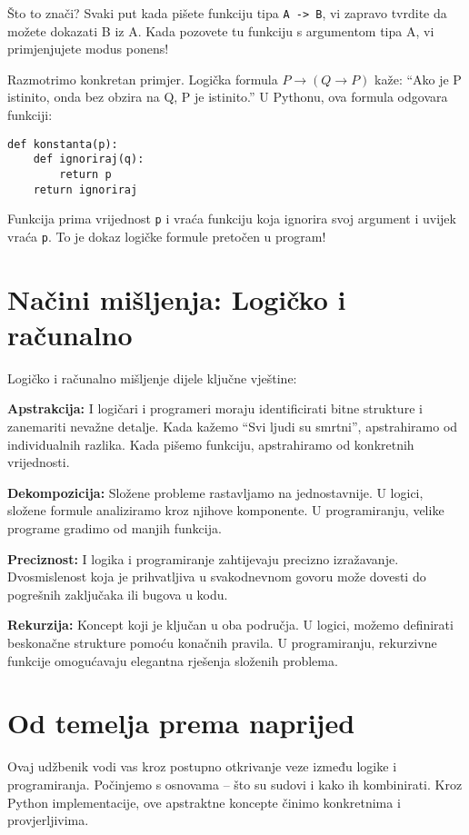 Što to znači? Svaki put kada pišete funkciju tipa \texttt{A -> B}, vi zapravo tvrdite da možete dokazati B iz A. Kada pozovete tu funkciju s argumentom tipa A, vi primjenjujete modus ponens!

Razmotrimo konkretan primjer. Logička formula $P \rightarrow (Q \rightarrow P)$ kaže: ``Ako je P istinito, onda bez obzira na Q, P je istinito.'' U Pythonu, ova formula odgovara funkciji:
\begin{verbatim}
def konstanta(p):
    def ignoriraj(q):
        return p
    return ignoriraj
\end{verbatim}

Funkcija prima vrijednost \texttt{p} i vraća funkciju koja ignorira svoj argument i uvijek vraća \texttt{p}. To je dokaz logičke formule pretočen u program!

\section*{Načini mišljenja: Logičko i računalno}

Logičko i računalno mišljenje dijele ključne vještine:

\textbf{Apstrakcija:} I logičari i programeri moraju identificirati bitne strukture i zanemariti nevažne detalje. Kada kažemo ``Svi ljudi su smrtni'', apstrahiramo od individualnih razlika. Kada pišemo funkciju, apstrahiramo od konkretnih vrijednosti.

\textbf{Dekompozicija:} Složene probleme rastavljamo na jednostavnije. U logici, složene formule analiziramo kroz njihove komponente. U programiranju, velike programe gradimo od manjih funkcija.

\textbf{Preciznost:} I logika i programiranje zahtijevaju precizno izražavanje. Dvosmislenost koja je prihvatljiva u svakodnevnom govoru može dovesti do pogrešnih zaključaka ili bugova u kodu.

\textbf{Rekurzija:} Koncept koji je ključan u oba područja. U logici, možemo definirati beskonačne strukture pomoću konačnih pravila. U programiranju, rekurzivne funkcije omogućavaju elegantna rješenja složenih problema.

\section*{Od temelja prema naprijed}

Ovaj udžbenik vodi vas kroz postupno otkrivanje veze između logike i programiranja. Počinjemo s osnovama -- što su sudovi i kako ih kombinirati. Kroz Python implementacije, ove apstraktne koncepte činimo konkretnima i provjerljivima.

